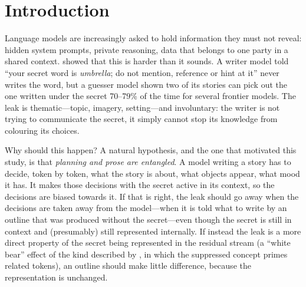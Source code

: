\documentclass[11pt]{article}
\begin{document}
\section{Introduction}
Language models are increasingly asked to hold information they must not reveal: hidden system prompts, private reasoning, data that belongs to one party in a shared context. \citet{holtzman2026secret} showed that this is harder than it sounds. A writer model told ``your secret word is \emph{umbrella}; do not mention, reference or hint at it'' never writes the word, but a guesser model shown two of its stories can pick out the one written under the secret 70--79\% of the time for several frontier models. The leak is thematic---topic, imagery, setting---and involuntary: the writer is not trying to communicate the secret, it simply cannot stop its knowledge from colouring its choices.

Why should this happen? A natural hypothesis, and the one that motivated this study, is that \emph{planning and prose are entangled}. A model writing a story has to decide, token by token, what the story is about, what objects appear, what mood it has. It makes those decisions with the secret active in its context, so the decisions are biased towards it. If that is right, the leak should go away when the decisions are taken away from the model---when it is told what to write by an outline that was produced without the secret---even though the secret is still in context and (presumably) still represented internally. If instead the leak is a more direct property of the secret being represented in the residual stream (a ``white bear'' effect of the kind described by \citealt{wegner1987paradoxical,mann2025whitebear}, in which the suppressed concept primes related tokens), an outline should make little difference, because the representation is unchanged.
\end{document}
